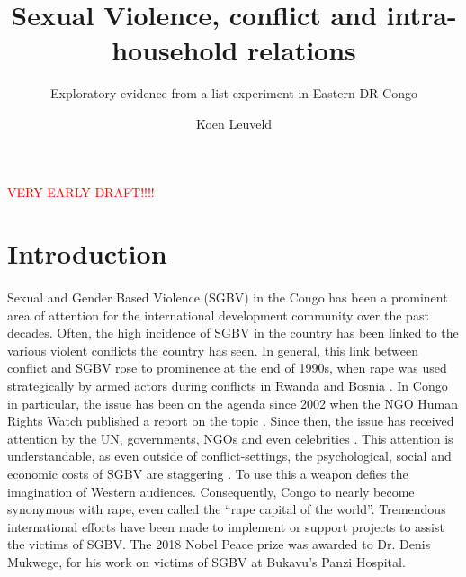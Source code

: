 \documentclass[11pt,a4paper]{scrartcl} %
\begin{document}
\author{Koen Leuveld}




\title{Sexual Violence, conflict and intra-household relations}
\subtitle{Exploratory evidence from a list experiment in Eastern DR Congo} %

\maketitle

\begin{center}
\textcolor{red}{\Large VERY EARLY DRAFT!!!!}
\end{center}


\section*{Introduction}

\paragraph{}
Sexual and Gender Based Violence (SGBV) in the Congo has been a prominent area of attention for the international development community over the past decades. Often, the high incidence of SGBV in the country has been linked to the various violent conflicts the country has seen. In general, this link between conflict and SGBV rose to prominence at the end of 1990s, when rape was used strategically by armed actors during conflicts in Rwanda and Bosnia  \citep{Kirby2015}. In Congo in particular, the issue has been on the agenda since 2002 when the NGO Human Rights Watch published a report on the topic \citep{HRW2002}. Since then, the issue has received attention by the UN, governments, NGOs and even celebrities \citep{Baaz2013}. This attention is understandable, as even outside of conflict-settings, the psychological, social and economic costs of SGBV are staggering \citep{Post2002,Peterson2018}. To use this a weapon defies the imagination of Western audiences. Consequently, Congo to nearly become synonymous with rape, even called the ``rape capital of the world''. Tremendous international efforts have been made to implement or support projects to assist the victims of SGBV. The 2018 Nobel Peace prize was awarded to Dr. Denis Mukwege, for his work on victims of SGBV at Bukavu's Panzi Hospital.
 
\end{document}
